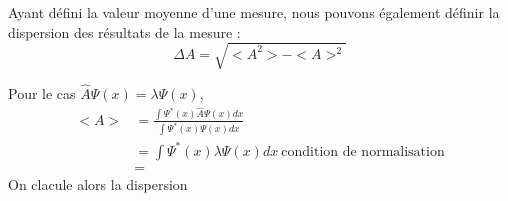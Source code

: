 \documentclass[../main.tex]{subfile}
\begin{document}
Ayant défini la valeur moyenne d'une mesure, nous pouvons également définir la dispersion des résultats de la mesure :
$$\Delta A = \sqrt{<A^2> - <A>^2}$$

\begin{ex}
	Pour le cas $\hat{A} \Psi(x) = \lambda \Psi(x)$, 
	$$
\begin{aligned}
	<A> &= \frac{\int \Psi^*(x) \hat{A} \Psi(x) dx}{\int \Psi^*(x) \Psi(x) dx}\\
	&= \int \Psi^*(x) \lambda \Psi(x) dx \ \text{condition de normalisation}\\
	&= 
\end{aligned}
	$$
	On clacule alors la dispersion 
	$$
\begin{aligned}
\end{aligned}
	$$
\end{ex}
\end{document}
